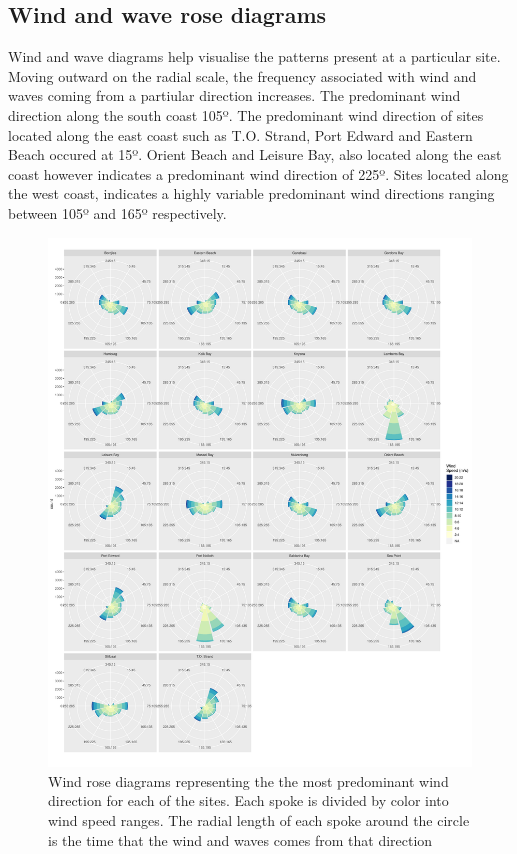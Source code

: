 \documentclass[12pt,a4paper,]{article}
\begin{document}
\hypertarget{wind-and-wave-rose-diagrams}{%
\subsection{Wind and wave rose
diagrams}\label{wind-and-wave-rose-diagrams}}

Wind and wave diagrams help visualise the patterns present at a
particular site. Moving outward on the radial scale, the frequency
associated with wind and waves coming from a partiular direction
increases. The predominant wind direction along the south coast 105º.
The predominant wind direction of sites located along the east coast
such as T.O. Strand, Port Edward and Eastern Beach occured at 15º.
Orient Beach and Leisure Bay, also located along the east coast however
indicates a predominant wind direction of 225º. Sites located along the
west coast, indicates a highly variable predominant wind directions
ranging between 105º and 165º respectively.

\begin{figure}
\centering
\includegraphics{../figures/p.wr3.pdf}
\caption{Wind rose diagrams representing the the most predominant wind
direction for each of the sites. Each spoke is divided by color into
wind speed ranges. The radial length of each spoke around the circle is
the time that the wind and waves comes from that direction}
\end{figure}
\end{document}
